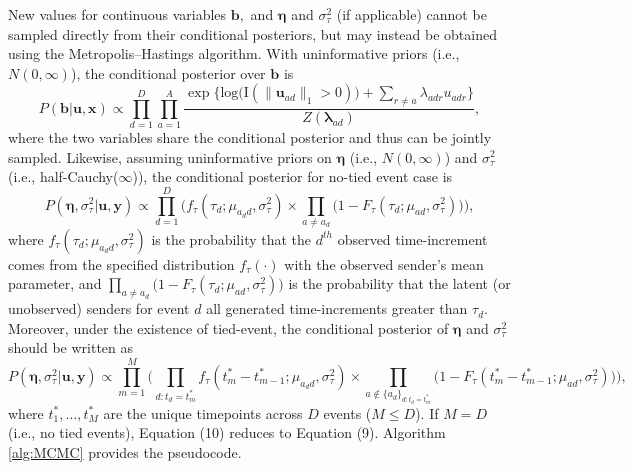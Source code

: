 \documentclass[12pt]{article}
\begin{document}
New values for continuous variables $\boldsymbol{b},$ and $\boldsymbol{\eta}$ and $\sigma^2_\tau$ (if applicable) cannot be sampled directly from their conditional posteriors, but may instead be obtained using the Metropolis--Hastings algorithm. With uninformative priors (i.e., $N({0},\infty)$), the conditional posterior over $\boldsymbol{b}$ is
\begin{equation}
P(\boldsymbol{b}| \boldsymbol{u}, \boldsymbol{x})\propto \prod_{d=1}^D
\prod_{a=1}^A \frac{\exp\Big\{\mbox{log}\big(\text{I}( \lVert \boldsymbol{u}_{ad}\rVert_1 > 0)\big) + \sum\limits_{r \neq a} \lambda_{adr}u_{adr}\Big\}}{Z(\boldsymbol{\lambda}_{ad})},
\end{equation}
where the two variables share the conditional posterior and thus can be jointly sampled. Likewise, assuming uninformative priors on $\boldsymbol{\eta}$ (i.e., $N({0},\infty)$) and $\sigma_{\tau}^2$ (i.e., half-Cauchy($\infty$)), the conditional posterior for no-tied event case is
\begin{equation}
P(\boldsymbol{\eta}, \sigma_\tau^2| \boldsymbol{u}, \boldsymbol{y})\propto \prod_{d=1}^D\Big(f_{\tau}(\tau_{d}; \mu_{a_d d}, \sigma_\tau^2)\times \prod_{a\neq a_d}\big(1-F_{\tau}(\tau_{d}; \mu_{a d}, \sigma_\tau^2) \big)\Big),
\end{equation}
where $f_{\tau}(\tau_{d}; \mu_{a_d d}, \sigma_\tau^2)$ is the probability that the $d^{th}$ observed time-increment comes from the specified distribution $f_\tau(\cdot)$ with the observed sender's mean parameter, and $\prod_{a\neq a_d}\big(1-F_{\tau}(\tau_{d}; \mu_{a d}, \sigma_\tau^2) \big)$ is the probability that the latent (or unobserved) senders for event $d$ all generated time-increments greater than $\tau_d$. Moreover, under the existence of tied-event, the conditional posterior of $\boldsymbol{\eta}$ and $\sigma_{\tau}^2$ should be written as
\begin{equation}
P(\boldsymbol{\eta}, \sigma_\tau^2| \boldsymbol{u}, \boldsymbol{y})\propto \prod_{m=1}^M\Big(\prod_{d:t_d=t_m^*}f_{\tau}(t_m^*-t_{m-1}^*; \mu_{a_d d}, \sigma_\tau^2)\times \prod_{a \notin \{a_d\}_{d:t_d=t_m^*}}\big(1-F_{\tau}(t_m^*-t_{m-1}^*; \mu_{a d}, \sigma_\tau^2) \big)\Big),
\end{equation}
where $t_1^*,\ldots,t_M^*$ are the unique timepoints across $D$ events ($M \leq D$). If $M=D$ (i.e., no tied events), Equation (10) reduces to Equation (9). Algorithm \ref{alg:MCMC} provides the pseudocode.
\end{document}
